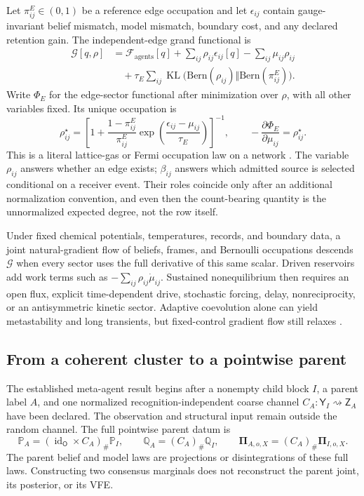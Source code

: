 \documentclass[11pt,letterpaper]{article}
\newcommand{\KL}{\operatorname{KL}}
\newcommand{\Prob}{\mathbb P}
\newcommand{\Rec}{\mathbb Q}
\newcommand{\Post}{\boldsymbol\Pi}
\newcommand{\id}{\operatorname{id}}
\begin{document}
Let \(\pi_{ij}^{E}\in(0,1)\) be a reference edge occupation and let \(\epsilon_{ij}\) contain gauge-invariant belief mismatch, model mismatch, boundary cost, and any declared retention gain. The independent-edge grand functional is
\begin{align}
  \mathcal G[q,\rho]
  &=\mathcal F_{\mathrm{agents}}[q]
  +\sum_{ij}\rho_{ij}\epsilon_{ij}[q]
  -\sum_{ij}\mu_{ij}\rho_{ij}
  \nonumber\\
  &\quad+\tau_E\sum_{ij}
  \KL\bigl(\mathrm{Bern}(\rho_{ij})\Vert
            \mathrm{Bern}(\pi_{ij}^{E})\bigr).
  \label{eq:grand-edge-functional}
\end{align}
Write \(\Phi_E\) for the edge-sector functional after minimization over \(\rho\), with all other variables fixed. Its unique occupation is
\begin{equation}
  \rho_{ij}^{\star}
  =\left[
    1+\frac{1-\pi_{ij}^{E}}{\pi_{ij}^{E}}
    \exp\left(\frac{\epsilon_{ij}-\mu_{ij}}{\tau_E}\right)
  \right]^{-1},
  \qquad
  -\frac{\partial\Phi_E}{\partial\mu_{ij}}=\rho_{ij}^{\star}.
  \label{eq:grand-edge-occupation}
\end{equation}
This is a literal lattice-gas or Fermi occupation law on a network \cite{ParkNewman2004}. The variable \(\rho_{ij}\) answers whether an edge exists; \(\beta_{ij}\) answers which admitted source is selected conditional on a receiver event. Their roles coincide only after an additional normalization convention, and even then the count-bearing quantity is the unnormalized expected degree, not the row itself.

Under fixed chemical potentials, temperatures, records, and boundary data, a joint natural-gradient flow of beliefs, frames, and Bernoulli occupations descends \(\mathcal G\) when every sector uses the full derivative of this same scalar. Driven reservoirs add work terms such as \(-\sum_{ij}\rho_{ij}\dot\mu_{ij}\). Sustained nonequilibrium then requires an open flux, explicit time-dependent drive, stochastic forcing, delay, nonreciprocity, or an antisymmetric kinetic sector. Adaptive coevolution alone can yield metastability and long transients, but fixed-control gradient flow still relaxes \cite{GrossBlasius2008}.

\subsection{From a coherent cluster to a pointwise parent}

The established meta-agent result begins after a nonempty child block \(I\), a parent label \(A\), and one normalized recognition-independent coarse channel \(C_A:\mathsf Y_I\rightsquigarrow\mathsf Z_A\) have been declared. The observation and structural input remain outside the random channel. The full pointwise parent datum is
\begin{equation}
  \Prob_A=(\id_{\mathsf O}\times C_A)_{\#}\Prob_I,
  \qquad
  \Rec_A=(C_A)_{\#}\Rec_I,
  \qquad
  \Post_{A,o,X}=(C_A)_{\#}\Post_{I,o,X}.
  \label{eq:parent-full-triple}
\end{equation}
The parent belief and model laws are projections or disintegrations of these full laws. Constructing two consensus marginals does not reconstruct the parent joint, its posterior, or its VFE.
\end{document}
